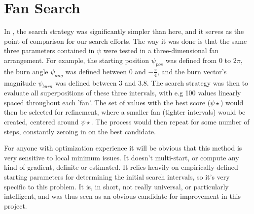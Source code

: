 \section{Fan Search}
In \cite{Saxe2015}, the search strategy was significantly simpler than here, and it serves as the point of comparison for our search efforts. The way it was done is that the same three parameters contained in $\psi$ were tested in a three-dimensional fan arrangement. For example, the starting position $\psi_{pos}$ was defined from 0 to $2\pi$, the burn angle $\psi_{ang}$ was defined between 0 and $-\frac{\pi}{4}$, and the burn vector's magnitude $\psi_{burn}$ was defined between 3 and 3.8. The search strategy was then to evaluate all superpositions of these three intervals, with e.g 100 values linearly spaced throughout each 'fan'. The set of values with the best score ($\psi\star$) would then be selected for refinement, where a smaller fan (tighter intervals) would be created, centered around $\psi\star$. The process would then repeat for some number of steps, constantly zeroing in on the best candidate.

For anyone with optimization experience it will be obvious that this method is very sensitive to local minimum issues. It doesn't multi-start, or compute any kind of gradient, definite or estimated. It relies heavily on empirically defined starting parameters for determining the initial search intervals, so it's very specific to this problem. It is, in short, not really universal, or particularly intelligent, and was thus seen as an obvious candidate for improvement in this project.

